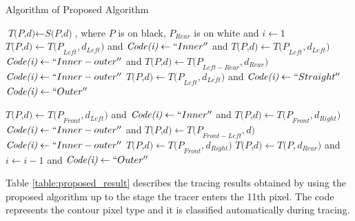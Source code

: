 \begin{algorithm}
	\caption{Algorithm of Proposed Algorithm}
	\label{alg:proposed}
	\begin{algorithmic}[1]
	\State $\textit{T(P,d)} \gets \textit{S(P,d)}$, where $P$ is on black, $P_{Rear}$ is on white and $i \gets 1$
	\Do
			\State $\textit{T(P,d)} \gets \textit{T(P}_{Left},\textit{d}_{Left} )  $ and $\textit{Code(i)} \gets ``Inner''$ and $\textit{T(P,d)} \gets \textit{T(P}_{Left}, \textit{d}_{Left})$
		\Else
			\State $\textit{Code(i)} \gets ``Inner-outer''$ and $\textit{T(P,d)} \gets \textit{T(P}_{Left-Rear},\textit{d}_{Rear} )  $
			\State $\textit{Code(i)} \gets ``Inner-outer''$
		\EndIf
	\Else
			\State $\textit{T(P,d)} \gets \textit{T(P}_{Left},\textit{d}_{Left} )  $ and $\textit{Code(i)} \gets ``Straight''$
		\Else
			\State $\textit{Code(i)} \gets ``Outer''$
		\EndIf
	\EndIf


			\State $\textit{T(P,d)} \gets \textit{T(P}_{Front},\textit{d}_{Left} )  $ and $\textit{Code(i)} \gets ``Inner''$ and $\textit{T(P,d)} \gets \textit{T(P}_{Front}, \textit{d}_{Right})$
		\Else
			\State $\textit{Code(i)} \gets ``Inner-outer''$ and $\textit{T(P,d)} \gets \textit{T(P}_{Front-Left},\textit{d} )  $
			\State $\textit{Code(i)} \gets ``Inner-outer''$
		\EndIf
		\State $\textit{T(P,d)} \gets \textit{T(P}_{Front},\textit{d}_{Right} )  $
	\Else
		\State $\textit{T(P,d)} \gets \textit{T(P},\textit{d}_{Rear} )  $ and $i \gets i-1$ and $\textit{Code(i)} \gets ``Outer''$
	\EndIf


	\EndProcedure
	\end{algorithmic}
\end{algorithm}

Table \ref{table:proposed_result} describes the tracing results obtained by using the proposed algorithm up to the stage the tracer enters the 11th pixel. The code represents the contour pixel type and it is classified automatically during tracing. 

